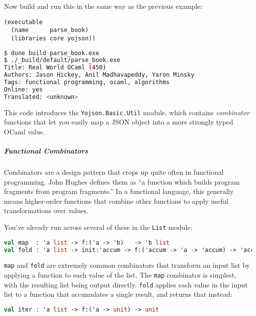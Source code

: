 Now build and run this in the same way as the previous example:

\begin{lstlisting}
(executable
  (name      parse_book)
  (libraries core yojson))
\end{lstlisting}

\begin{lstlisting}[language=bash]
$ dune build parse_book.exe
$ ./_build/default/parse_book.exe
Title: Real World OCaml (450)
Authors: Jason Hickey, Anil Madhavapeddy, Yaron Minsky
Tags: functional programming, ocaml, algorithms
Online: yes
Translated: <unknown>
\end{lstlisting}

This code introduces the \passthrough{\lstinline!Yojson.Basic.Util!}
module, which contains \emph{combinator} functions that let you easily
map a JSON object into a more strongly typed OCaml value.

\hypertarget{functional-combinators}{%
\subparagraph{Functional Combinators}\label{functional-combinators}}

Combinators are a design pattern that crops up quite often in functional
programming. John Hughes defines them as ``a function which builds
program fragments from program fragments.'' In a functional language,
this generally means higher-order functions that combine other functions
to apply useful transformations over values.

You've already run across several of these in the
\passthrough{\lstinline!List!} module:

\begin{lstlisting}[language=Caml]
val map  : 'a list -> f:('a -> 'b)   -> 'b list
val fold : 'a list -> init:'accum -> f:('accum -> 'a -> 'accum) -> 'accum
\end{lstlisting}

\passthrough{\lstinline!map!} and \passthrough{\lstinline!fold!} are
extremely common combinators that transform an input list by applying a
function to each value of the list. The \passthrough{\lstinline!map!}
combinator is simplest, with the resulting list being output directly.
\passthrough{\lstinline!fold!} applies each value in the input list to a
function that accumulates a single result, and returns that instead:

\begin{lstlisting}[language=Caml]
val iter : 'a list -> f:('a -> unit) -> unit
\end{lstlisting}

